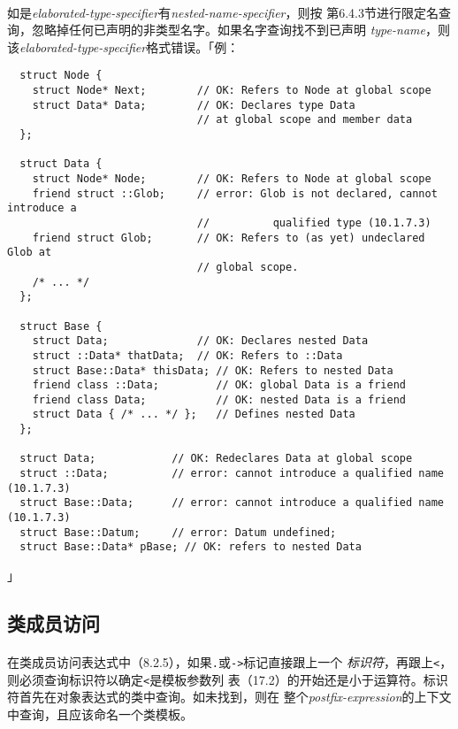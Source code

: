 \paragraph{}
如是\textit{elaborated-type-specifier}有\textit{nested-name-specifier}，则按
第6.4.3节进行限定名查询，忽略掉任何已声明的非类型名字。如果名字查询找不到已声明
\textit{type-name}，则该\textit{elaborated-type-specifier}格式错误。「例：
\begin{lstlisting}
  struct Node {
    struct Node* Next;        // OK: Refers to Node at global scope
    struct Data* Data;        // OK: Declares type Data
                              // at global scope and member data
  };

  struct Data {
    struct Node* Node;        // OK: Refers to Node at global scope
    friend struct ::Glob;     // error: Glob is not declared, cannot introduce a
                              //          qualified type (10.1.7.3)
    friend struct Glob;       // OK: Refers to (as yet) undeclared Glob at
                              // global scope.
    /* ... */
  };

  struct Base {
    struct Data;              // OK: Declares nested Data
    struct ::Data* thatData;  // OK: Refers to ::Data
    struct Base::Data* thisData; // OK: Refers to nested Data
    friend class ::Data;         // OK: global Data is a friend
    friend class Data;           // OK: nested Data is a friend
    struct Data { /* ... */ };   // Defines nested Data
  };

  struct Data;            // OK: Redeclares Data at global scope
  struct ::Data;          // error: cannot introduce a qualified name (10.1.7.3)
  struct Base::Data;      // error: cannot introduce a qualified name (10.1.7.3)
  struct Base::Datum;     // error: Datum undefined;
  struct Base::Data* pBase; // OK: refers to nested Data
\end{lstlisting}」

\subsection{类成员访问}
\paragraph{}
在类成员访问表达式中（8.2.5），如果\texttt{.}或\texttt{->}标记直接跟上一个
\textit{标识符}，再跟上\texttt{<}，则必须查询标识符以确定\texttt{<}是模板参数列
表（17.2）的开始还是小于运算符。标识符首先在对象表达式的类中查询。如未找到，则在
整个\textit{postfix-expression}的上下文中查询，且应该命名一个类模板。

